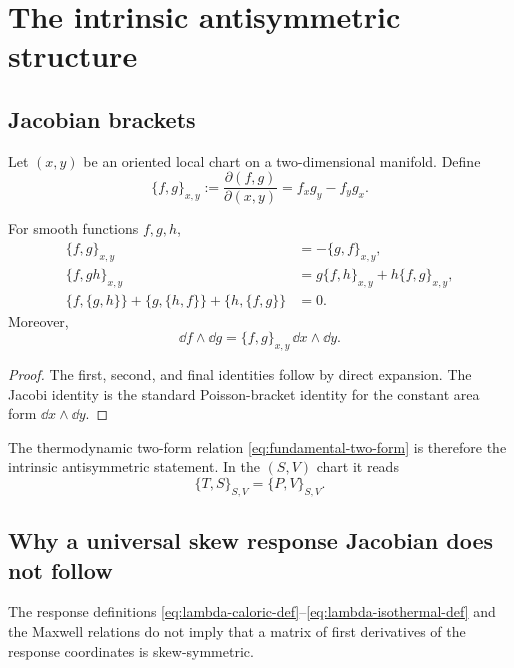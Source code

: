 \section{The intrinsic antisymmetric structure}

\subsection{Jacobian brackets}

Let $(x,y)$ be an oriented local chart on a two-dimensional manifold.  Define
\[
\{f,g\}_{x,y}
:=\frac{\partial(f,g)}{\partial(x,y)}
=f_xg_y-f_yg_x.
\]

\begin{proposition}
For smooth functions $f,g,h$,
\begin{align*}
\{f,g\}_{x,y}&=-\{g,f\}_{x,y},\\
\{f,gh\}_{x,y}&=g\{f,h\}_{x,y}+h\{f,g\}_{x,y},\\
\{f,\{g,h\}\}+\{g,\{h,f\}\}+\{h,\{f,g\}\}&=0.
\end{align*}
Moreover,
\[
\dd f\wedge\dd g=\{f,g\}_{x,y}\,\dd x\wedge\dd y.
\]
\end{proposition}

\begin{proof}
The first, second, and final identities follow by direct expansion.  The Jacobi identity is the standard Poisson-bracket identity for the constant area form $\dd x\wedge\dd y$.
\end{proof}

The thermodynamic two-form relation \eqref{eq:fundamental-two-form} is therefore the intrinsic antisymmetric statement.  In the $(S,V)$ chart it reads
\[
\{T,S\}_{S,V}=\{P,V\}_{S,V}.
\]

\subsection{Why a universal skew response Jacobian does not follow}

\begin{proposition}
The response definitions \eqref{eq:lambda-caloric-def}--\eqref{eq:lambda-isothermal-def} and the Maxwell relations do not imply that a matrix of first derivatives of the response coordinates is skew-symmetric.
\end{proposition}


